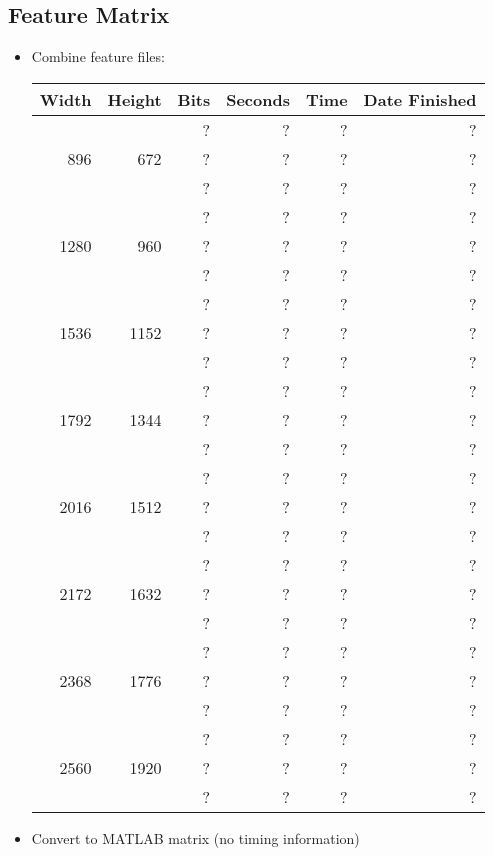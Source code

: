 \subsection{Feature Matrix}
\begin{itemize}
  \item Combine feature files:
  \begin{center}
  \begin{tabular}{ r r r | r r r }
  Width & Height & Bits & Seconds & Time & Date Finished \\ \hline
  \multirow{3}{*}{896} & \multirow{3}{*}{672} & ? & ? & ? & ? \\
  & & ? & ? & ? & ? \\
  & & ? & ? & ? & ? \\
  \hline
  \multirow{3}{*}{1280} & \multirow{3}{*}{960} & ? & ? & ? & ? \\
  & & ? & ? & ? & ? \\
  & & ? & ? & ? & ? \\
  \hline
  \multirow{3}{*}{1536} & \multirow{3}{*}{1152} & ? & ? & ? & ? \\
  & & ? & ? & ? & ? \\
  & & ? & ? & ? & ? \\
  \hline
  \multirow{3}{*}{1792} & \multirow{3}{*}{1344} & ? & ? & ? & ? \\
  & & ? & ? & ? & ? \\
  & & ? & ? & ? & ? \\
  \hline
  \multirow{3}{*}{2016} & \multirow{3}{*}{1512} & ? & ? & ? & ? \\
  & & ? & ? & ? & ? \\
  & & ? & ? & ? & ? \\
  \hline
  \multirow{3}{*}{2172} & \multirow{3}{*}{1632} & ? & ? & ? & ? \\
  & & ? & ? & ? & ? \\
  & & ? & ? & ? & ? \\
  \hline
  \multirow{3}{*}{2368} & \multirow{3}{*}{1776} & ? & ? & ? & ? \\
  & & ? & ? & ? & ? \\
  & & ? & ? & ? & ? \\
  \hline
  \multirow{3}{*}{2560} & \multirow{3}{*}{1920} & ? & ? & ? & ? \\
  & & ? & ? & ? & ? \\
  & & ? & ? & ? & ? \\
  \end{tabular}
  \end{center}
  
  \item Convert to MATLAB matrix (no timing information)
\end{itemize}

